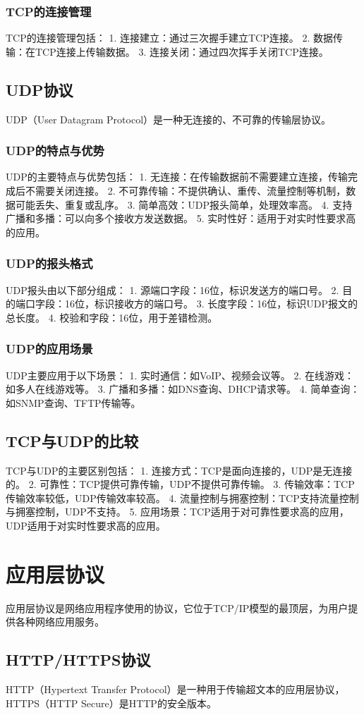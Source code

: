 \documentclass{book}
\begin{document}
\subsubsection{TCP的连接管理}
TCP的连接管理包括：
1. 连接建立：通过三次握手建立TCP连接。
2. 数据传输：在TCP连接上传输数据。
3. 连接关闭：通过四次挥手关闭TCP连接。
\subsection{UDP协议}
UDP（User Datagram Protocol）是一种无连接的、不可靠的传输层协议。
\subsubsection{UDP的特点与优势}
UDP的主要特点与优势包括：
1. 无连接：在传输数据前不需要建立连接，传输完成后不需要关闭连接。
2. 不可靠传输：不提供确认、重传、流量控制等机制，数据可能丢失、重复或乱序。
3. 简单高效：UDP报头简单，处理效率高。
4. 支持广播和多播：可以向多个接收方发送数据。
5. 实时性好：适用于对实时性要求高的应用。
\subsubsection{UDP的报头格式}
UDP报头由以下部分组成：
1. 源端口字段：16位，标识发送方的端口号。
2. 目的端口字段：16位，标识接收方的端口号。
3. 长度字段：16位，标识UDP报文的总长度。
4. 校验和字段：16位，用于差错检测。
\subsubsection{UDP的应用场景}
UDP主要应用于以下场景：
1. 实时通信：如VoIP、视频会议等。
2. 在线游戏：如多人在线游戏等。
3. 广播和多播：如DNS查询、DHCP请求等。
4. 简单查询：如SNMP查询、TFTP传输等。
\subsection{TCP与UDP的比较}
TCP与UDP的主要区别包括：
1. 连接方式：TCP是面向连接的，UDP是无连接的。
2. 可靠性：TCP提供可靠传输，UDP不提供可靠传输。
3. 传输效率：TCP传输效率较低，UDP传输效率较高。
4. 流量控制与拥塞控制：TCP支持流量控制与拥塞控制，UDP不支持。
5. 应用场景：TCP适用于对可靠性要求高的应用，UDP适用于对实时性要求高的应用。
\section{应用层协议}
应用层协议是网络应用程序使用的协议，它位于TCP/IP模型的最顶层，为用户提供各种网络应用服务。
\subsection{HTTP/HTTPS协议}
HTTP（Hypertext Transfer Protocol）是一种用于传输超文本的应用层协议，HTTPS（HTTP Secure）是HTTP的安全版本。
\end{document}
